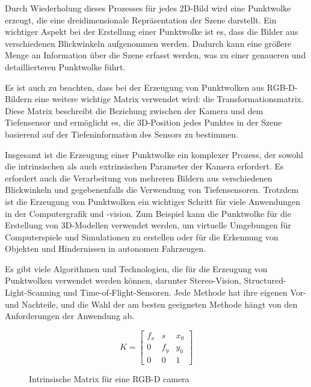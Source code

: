 Durch Wiederholung dieses Prozesses für jedes 2D-Bild wird eine Punktwolke erzeugt, die eine dreidimensionale Repräsentation der Szene darstellt. Ein wichtiger Aspekt bei der Erstellung einer Punktwolke ist es, dass die Bilder aus verschiedenen Blickwinkeln aufgenommen werden. Dadurch kann eine größere Menge an Information über die Szene erfasst werden, was zu einer genaueren und detaillierteren Punktwolke führt.

Es ist auch zu beachten, dass bei der Erzeugung von Punktwolken aus \ac{RGB-D}-Bildern eine weitere wichtige Matrix verwendet wird: die Transformationsmatrix. Diese Matrix beschreibt die Beziehung zwischen der Kamera und dem Tiefensensor und ermöglicht es, die 3D-Position jedes Punktes in der Szene basierend auf der Tiefeninformation des Sensors zu bestimmen.

Insgesamt ist die Erzeugung einer Punktwolke ein komplexer Prozess, der sowohl die intrinsischen als auch extrinsischen Parameter der Kamera erfordert. Es erfordert auch die Verarbeitung von mehreren Bildern aus verschiedenen Blickwinkeln und gegebenenfalls die Verwendung von Tiefensensoren. Trotzdem ist die Erzeugung von Punktwolken ein wichtiger Schritt für viele Anwendungen in der Computergrafik und -vision. Zum Beispiel kann die Punktwolke für die Erstellung von 3D-Modellen verwendet werden, um virtuelle Umgebungen für Computerspiele und Simulationen zu erstellen oder für die Erkennung von Objekten und Hindernissen in autonomen Fahrzeugen.

Es gibt viele Algorithmen und Technologien, die für die Erzeugung von Punktwolken verwendet werden können, darunter Stereo-Vision, Structured-Light-Scanning und Time-of-Flight-Sensoren. Jede Methode hat ihre eigenen Vor- und Nachteile, und die Wahl der am besten geeigneten Methode hängt von den Anforderungen der Anwendung ab.



\begin{figure}
\begin{equation*}
    K = \begin{bmatrix}
    f_x & s & x_0 \\
    0 & f_y & y_0 \\
    0 & 0 & 1
    \end{bmatrix}
    \end{equation*}
    \caption{Intrinsische Matrix für eine \ac{RGB-D} camera}
\end{figure}

